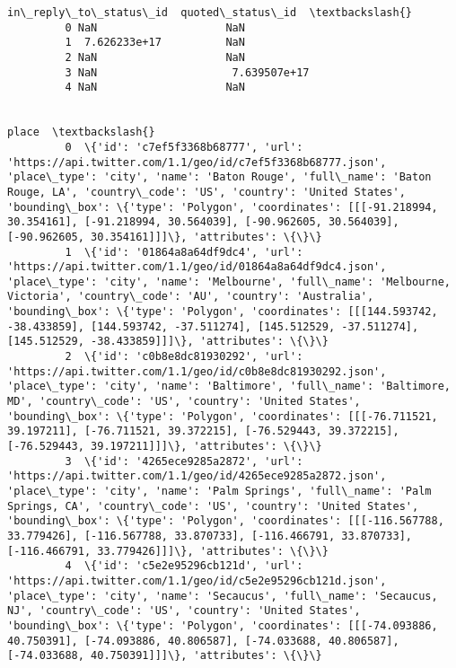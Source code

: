 \documentclass[11pt]{article}
\begin{document}
\begin{Verbatim}[commandchars=\\\{\}]
            in\_reply\_to\_status\_id  quoted\_status\_id  \textbackslash{}
         0 NaN                    NaN                 
         1  7.626233e+17          NaN                 
         2 NaN                    NaN                 
         3 NaN                     7.639507e+17       
         4 NaN                    NaN                 
         
                                                                                                                                                                                                                                                                                                                                                                                                                       place  \textbackslash{}
         0  \{'id': 'c7ef5f3368b68777', 'url': 'https://api.twitter.com/1.1/geo/id/c7ef5f3368b68777.json', 'place\_type': 'city', 'name': 'Baton Rouge', 'full\_name': 'Baton Rouge, LA', 'country\_code': 'US', 'country': 'United States', 'bounding\_box': \{'type': 'Polygon', 'coordinates': [[[-91.218994, 30.354161], [-91.218994, 30.564039], [-90.962605, 30.564039], [-90.962605, 30.354161]]]\}, 'attributes': \{\}\}         
         1  \{'id': '01864a8a64df9dc4', 'url': 'https://api.twitter.com/1.1/geo/id/01864a8a64df9dc4.json', 'place\_type': 'city', 'name': 'Melbourne', 'full\_name': 'Melbourne, Victoria', 'country\_code': 'AU', 'country': 'Australia', 'bounding\_box': \{'type': 'Polygon', 'coordinates': [[[144.593742, -38.433859], [144.593742, -37.511274], [145.512529, -37.511274], [145.512529, -38.433859]]]\}, 'attributes': \{\}\}       
         2  \{'id': 'c0b8e8dc81930292', 'url': 'https://api.twitter.com/1.1/geo/id/c0b8e8dc81930292.json', 'place\_type': 'city', 'name': 'Baltimore', 'full\_name': 'Baltimore, MD', 'country\_code': 'US', 'country': 'United States', 'bounding\_box': \{'type': 'Polygon', 'coordinates': [[[-76.711521, 39.197211], [-76.711521, 39.372215], [-76.529443, 39.372215], [-76.529443, 39.197211]]]\}, 'attributes': \{\}\}             
         3  \{'id': '4265ece9285a2872', 'url': 'https://api.twitter.com/1.1/geo/id/4265ece9285a2872.json', 'place\_type': 'city', 'name': 'Palm Springs', 'full\_name': 'Palm Springs, CA', 'country\_code': 'US', 'country': 'United States', 'bounding\_box': \{'type': 'Polygon', 'coordinates': [[[-116.567788, 33.779426], [-116.567788, 33.870733], [-116.466791, 33.870733], [-116.466791, 33.779426]]]\}, 'attributes': \{\}\}   
         4  \{'id': 'c5e2e95296cb121d', 'url': 'https://api.twitter.com/1.1/geo/id/c5e2e95296cb121d.json', 'place\_type': 'city', 'name': 'Secaucus', 'full\_name': 'Secaucus, NJ', 'country\_code': 'US', 'country': 'United States', 'bounding\_box': \{'type': 'Polygon', 'coordinates': [[[-74.093886, 40.750391], [-74.093886, 40.806587], [-74.033688, 40.806587], [-74.033688, 40.750391]]]\}, 'attributes': \{\}\}               
         

\end{Verbatim}
\end{document}
